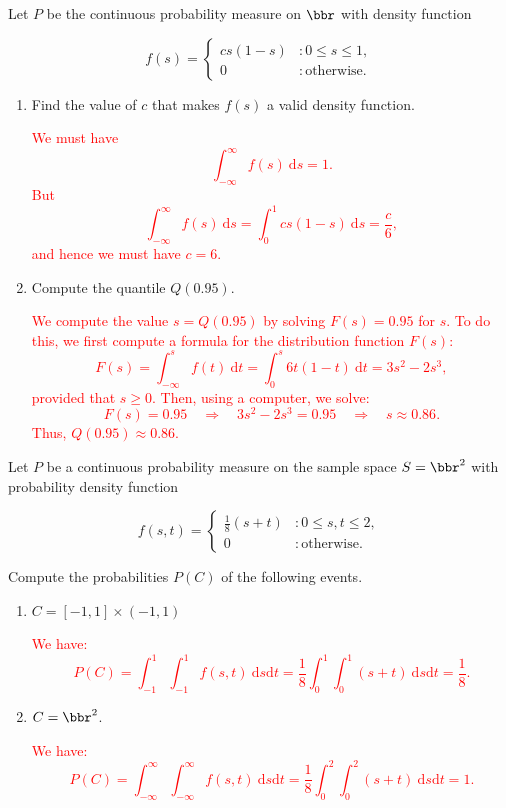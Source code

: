 \documentclass[12pt,reqno]{amsart}
\begin{document}
\bigskip
\prob Let $P$ be the continuous probability measure on $\bbr$ with density function

    \[f(s) = \begin{cases}
        cs(1-s) & : 0 \leq s \leq 1, \\
        0 & : \text{otherwise}.
    \end{cases}\]


\medskip
\begin{enumerate}
    \item Find the value of $c$ that makes $f(s)$ a valid density function.
    
    \bigskip
    \textcolor{red}{We must have
        \[\int_{-\infty}^\infty f(s) \ \text{d} s = 1.\]
    But
        \[\int_{-\infty}^\infty f(s) \ \text{d} s = \int_0^1 cs(1-s) \ \text{d} s = \frac{c}{6},\]
    and hence we must have $c=6$.}
    \bigskip

    \item Compute the quantile $Q(0.95)$.
    
    \bigskip
    \textcolor{red}{We compute the value $s = Q(0.95)$ by solving $F(s) = 0.95$ for $s$. To do this, we first compute a formula for the distribution function $F(s)$:
        \[F(s) = \int_{-\infty}^s f(t) \ \text{d} t =  \int_{0}^s 6t(1-t) \ \text{d} t = 3 s^2 - 2 s^3,\]
    provided that $s\geq 0$. Then, using a computer, we solve:
        \[F(s) = 0.95 \quad \Rightarrow \quad 3s^2-2s^3 = 0.95 \quad \Rightarrow \quad s\approx 0.86.\]
    Thus, $Q(0.95) \approx 0.86$.}
\end{enumerate}












\bigskip
\prob Let $P$ be a continuous probability measure on the sample space $S=\bbr^2$ with probability density function

\[f(s,t) = \begin{cases}
\frac{1}{8}(s+t) & : 0\leq s,t \leq 2, \\
0 & : \text{otherwise}.    
\end{cases}\]

Compute the probabilities $P(C)$ of the following events.

\medskip
\begin{enumerate}
\item $C=[-1,1] \times (-1,1)$

\bigskip
\textcolor{red}{We have:
    \[P(C) = \int_{-1}^1 \int_{-1}^1 f(s,t) \ \text{d}s\text{d}t = \frac{1}{8} \int_0^1 \int_0^1 (s+t) \ \text{d}s\text{d}t = \frac{1}{8}. \]}
\bigskip

\item $C = \bbr^2$.

\bigskip
\textcolor{red}{We have:
    \[P(C) = \int_{-\infty}^\infty \int_{-\infty}^\infty f(s,t) \ \text{d}s\text{d}t = \frac{1}{8} \int_0^2 \int_0^2 (s+t) \ \text{d}s\text{d}t = 1. \]}
\end{enumerate}
\end{document}
